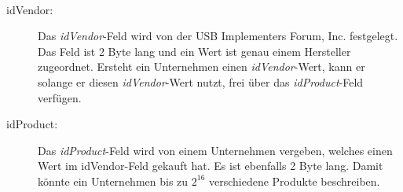 $ $\\\\
\begin{description}
	\item[idVendor: ] Das \textit{idVendor}-Feld wird von der USB Implementers Forum, Inc. festgelegt. Das Feld ist 2 Byte lang und ein Wert ist genau einem Hersteller zugeordnet. Ersteht ein Unternehmen einen \textit{idVendor}-Wert, kann er solange er diesen \textit{idVendor}-Wert nutzt, frei über das \textit{idProduct}-Feld verfügen.
	\item[idProduct: ] Das \textit{idProduct}-Feld wird von einem Unternehmen vergeben, welches einen Wert im idVendor-Feld gekauft hat. Es ist ebenfalls 2 Byte lang. Damit könnte ein Unternehmen bis zu $2^{16}$ verschiedene Produkte beschreiben.
	
\end{description}
